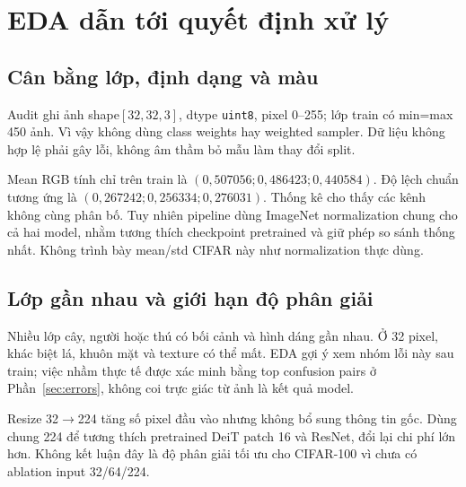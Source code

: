 \documentclass[11pt,a4paper]{article}
\begin{document}
\section{EDA dẫn tới quyết định xử lý}\label{sec:eda}
\subsection{Cân bằng lớp, định dạng và màu}
Audit ghi ảnh shape$[32,32,3]$, dtype \texttt{uint8}, pixel 0--255; lớp train có min=max 450 ảnh. Vì vậy không dùng class weights hay weighted sampler. Dữ liệu không hợp lệ phải gây lỗi, không âm thầm bỏ mẫu làm thay đổi split.

Mean RGB tính chỉ trên train là $(0{,}507056;0{,}486423;0{,}440584)$. Độ lệch chuẩn tương ứng là $(0{,}267242;0{,}256334;0{,}276031)$. Thống kê cho thấy các kênh không cùng phân bố. Tuy nhiên pipeline dùng ImageNet normalization chung cho cả hai model, nhằm tương thích checkpoint pretrained và giữ phép so sánh thống nhất. Không trình bày mean/std CIFAR này như normalization thực dùng.
\clearpage

\subsection{Lớp gần nhau và giới hạn độ phân giải}
Nhiều lớp cây, người hoặc thú có bối cảnh và hình dáng gần nhau. Ở 32 pixel, khác biệt lá, khuôn mặt và texture có thể mất. EDA gợi ý xem nhóm lỗi này sau train; việc nhầm thực tế được xác minh bằng top confusion pairs ở Phần~\ref{sec:errors}, không coi trực giác từ ảnh là kết quả model.

Resize 32$\to$224 tăng số pixel đầu vào nhưng không bổ sung thông tin gốc. Dùng chung 224 để tương thích pretrained DeiT patch 16 và ResNet, đổi lại chi phí lớn hơn. Không kết luận đây là độ phân giải tối ưu cho CIFAR-100 vì chưa có ablation input 32/64/224.
\clearpage
\end{document}
